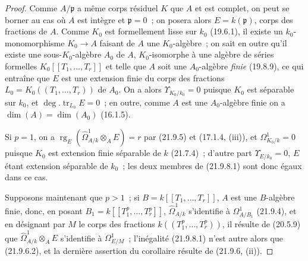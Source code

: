 \begin{proof}
Comme $A/\mathfrak p$ a même corps résiduel $K$ que $A$ et est complet, on
peut se borner au cas où $A$ est intègre et $\mathfrak p=0$~; on posera
alors $E=k(\mathfrak p)$, corps des fractions de $A$. Comme $K_0$ est
formellement lisse sur $k_0$ (19.6.1), il existe un $k_0$-monomorphisme
$K_0\to A$ faisant de $A$ une $K_0$-algèbre~; on sait en outre qu'il existe
une sous-$K_0$-algèbre $A_0$ de $A$, $K_0$-isomorphe à une algèbre de séries
formelles $K_0[[T_1,\ldots,T_r]]$ et telle que $A$ soit une $A_0$-algèbre
\emph{finie} (19.8.9), ce qui entraîne que $E$ est une extension finie du
corps des fractions $L_0=K_0((T_1,\ldots,T_r))$ de $A_0$. On a alors
$\Upsilon_{K_0/k_0}=0$ puisque $K_0$ est séparable sur $k_0$, et
$\deg.\operatorname{tr}_{L_0}E=0$~; en outre, comme $A$ est une
$A_0$-algèbre finie on a $\dim(A)=\dim(A_0)$ (16.1.5).

Si $p=1$, on a
$\operatorname{rg}_E(\widehat\Omega^1_{A/k}\otimes_AE)=r$ par (21.9.5) et
(17.1.4, (iii)), et $\Omega^1_{K_0/k}=0$ puisque $K_0$ est extension finie
séparable de $k$ (21.7.4)~; d'autre part $\Upsilon_{E/k_0}=0$, $E$ étant
extension séparable de $k_0$~; les deux membres de (21.9.8.1) sont donc égaux
dans ce cas.

Supposons maintenant que $p>1$~; si $B=k[[T_1,\ldots,T_r]]$, $A$ est une
$B$-algèbre finie, donc, en posant $B_1=k[[T_1^p,\ldots,T_r^p]]$,
$\widehat\Omega^1_{A/k}$ s'identifie à $\Omega^1_{A/B_1}$ (21.9.4), et en
désignant par $M$ le corps des fractions $k((T_1^p,\ldots,T_r^p))$, il
résulte de (20.5.9) que $\widehat\Omega^1_{A/k}\otimes_AE$ s'identifie à
$\Omega^1_{E/M}$~; l'inégalité (21.9.8.1) n'est autre alors que (21.9.6.2),
et la dernière assertion du corollaire résulte de (21.9.6, (ii)).
\end{proof}
